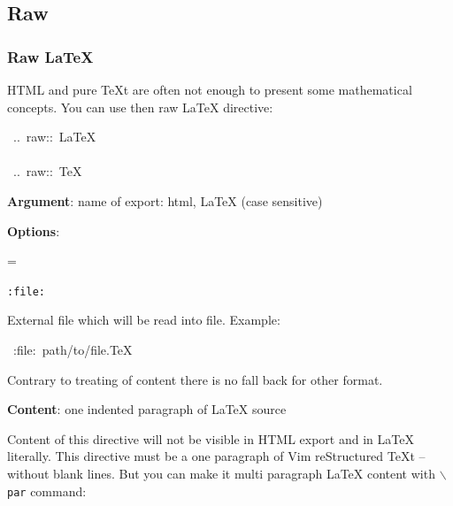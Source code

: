\documentclass[12pt]{article}
\newenvironment{deflist}[1]{%
\begin{list}{}
{\renewcommand{\makelabel}[1]{\textbf{##1}\hfill}
\settowidth{\labelwidth}{\textbf{#1}}
\leftmargin=\labelwidth
\advance \leftmargin\labelsep}}
{\end{list}}
\begin{document}
\subsection{Raw}
\hypertarget{lraw-LaTeX}{}
\subsubsection{Raw \LaTeX{}}

HTML and pure \TeX{}t are often not enough to present some mathematical
concepts. You can use then raw \LaTeX{} directive:

\begin{ttfamily}\begin{flushleft}
\mbox{~..~raw::~\LaTeX{}}\\
\mbox{}\\
\mbox{~..~raw::~\TeX{}}\\
\end{flushleft}\end{ttfamily}

\begin{itemize}
\item
\textbf{Argument}: name of export: html, \LaTeX{} (case sensitive)

\item
\textbf{Options}:

 \begin{deflist}{iii}

\item[ \texttt{:file:}]

External file which will be read into file. Example:

\begin{ttfamily}\begin{flushleft}
\mbox{~:file:~path/to/file.\TeX{}}\\
\end{flushleft}\end{ttfamily}

 Contrary to treating of content there is no fall back for other
 format.
\end{deflist}

\item
\textbf{Content}: one indented paragraph of \LaTeX{} source
\end{itemize}

Content of this directive will not be visible in HTML export and in \LaTeX{}
literally. This directive must be a one paragraph of Vim reStructured \TeX{}t -- without blank
lines. But you can make it multi paragraph \LaTeX{} content with \texttt{$\backslash$par}
command:
\end{document}
